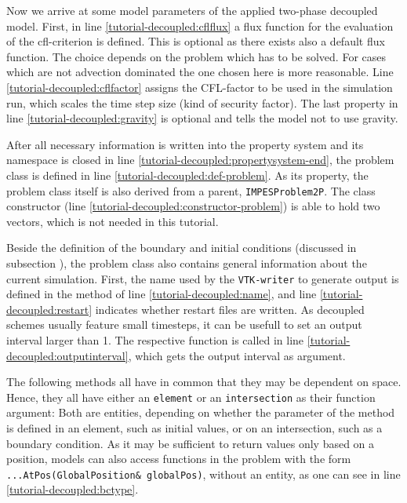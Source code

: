 Now we arrive at some model parameters of the applied two-phase decoupled 
model. First, in line  \ref{tutorial-decoupled:cflflux} a flux function for the evaluation of the cfl-criterion is defined. This is optional as there exists also a default flux function. The choice depends on the problem which has to be solved. For cases which are not advection dominated the one chosen here is more reasonable.
Line \ref{tutorial-decoupled:cflfactor} assigns the CFL-factor to be used in the
simulation run, which scales the time step size (kind of security factor). The last property in line \ref{tutorial-decoupled:gravity} 
is optional and tells the model not to use gravity.

After all necessary information is written into the property system and 
its namespace is closed in line \ref{tutorial-decoupled:propertysystem-end},
the problem class is defined in line \ref{tutorial-decoupled:def-problem}. 
As its property, the problem class itself is also derived from a parent, 
\texttt{IMPESProblem2P}. The class constructor (line 
\ref{tutorial-decoupled:constructor-problem}) is able to hold two vectors,
which is not needed in this tutorial.

Beside the definition of the boundary and initial conditions (discussed in 
subsection \label{decoupled-problem:boundary}), the problem class also contains
general information about the current simulation. First, the name used by
the \texttt{VTK-writer} to generate output is defined in the method of line
\ref{tutorial-decoupled:name}, and line \ref{tutorial-decoupled:restart} indicates
whether restart files are written. As decoupled schemes usually feature small 
timesteps, it can be usefull to set an output interval larger than 1. The respective function is called in line \ref{tutorial-decoupled:outputinterval}, which gets the output interval as argument.

The following methods all have in common that they may be dependent on space.
Hence, they all have either an \texttt{element} or an \texttt{intersection} as their
function argument: Both are \Dune entities, depending on whether the parameter of the method is defined in an element, such as 
    initial values, or on an intersection, such as a boundary condition. As it may be sufficient to return values only based on a position, \Dumux models can also access functions in the problem with the form \mbox{\texttt{...AtPos(GlobalPosition\& globalPos)}}, without an \Dune entity, as one can see in line \ref{tutorial-decoupled:bctype}.

